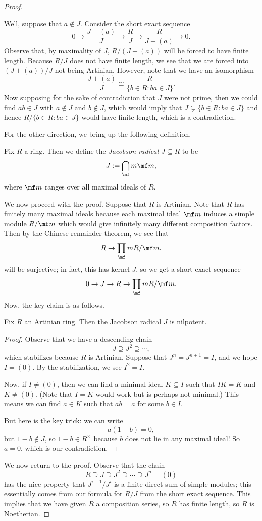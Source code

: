 \begin{proof}
\begin{itemize}
		Well, suppose that $a\notin J$. Consider the short exact sequence
		\[0\to\frac{J+(a)}J\to \frac RJ\to\frac R{J+(a)}\to0.\]
		Observe that, by maximality of $J$, $R/(J+(a))$ will be forced to have finite length. Because $R/J$ does not have finite length, we see that we are forced into $(J+(a))/J$ not being Artinian. However, note that we have an isomorphism
		\[\frac{J+(a)}J\cong\frac R{\{b\in R:ba\in J\}}.\]
		Now supposing for the sake of contradiction that $J$ were not prime, then we could find $ab\in J$ with $a\notin J$ and $b\notin J$, which would imply that $J\subsetneq\{b\in R:ba\in J\}$ and hence $R/\{b\in R:ba\in J\}$ would have finite length, which is a contradiction.
	\end{itemize}
	For the other direction, we bring up the following definition.
	\begin{definition}
		Fix $R$ a ring. Then we define the \textit{Jacobson radical} $J\subseteq R$ to be
		\[J:=\bigcap_\mf m\mf m,\]
		where $\mf m$ ranges over all maximal ideals of $R$.
	\end{definition}
	We now proceed with the proof. Suppose that $R$ is Artinian. Note that $R$ has finitely many maximal ideals because each maximal ideal $\mf m$ induces a simple module $R/\mf m$ which would give infinitely many different composition factors. %
	Then by the Chinese remainder theorem, we see that
	\[R\to\prod_\mf mR/\mf m.\]
	will be surjective; in fact, this has kernel $J$, so we get a short exact sequence
	\[0\to J\to R\to\prod_\mf mR/\mf m.\]
	Now, the key claim is as follows.
	\begin{lemma}
		Fix $R$ an Artinian ring. Then the Jacobson radical $J$ is nilpotent.
	\end{lemma}
	\begin{proof}
		Observe that we have a descending chain
		\[J\supseteq J^2\supseteq\cdots,\]
		which stabilizes because $R$ is Artinian. Suppose that $J^n=J^{n+1}=I$, and we hope $I=(0)$. By the stabilization, we see $I^2=I$.

		Now, if $I\ne(0)$, then we can find a minimal ideal $K\subseteq I$ such that $IK=K$ and $K\ne(0)$. (Note that $I=K$ would work but is perhaps not minimal.) This means we can find $a\in K$ such that $ab=a$ for some $b\in I$.

		But here is the key trick: we can write
		\[a(1-b)=0,\]
		but $1-b\notin J$, so $1-b\in R^\times$ because $b$ does not lie in any maximal ideal! So $a=0$, which is our contradiction.
	\end{proof}
	We now return to the proof. Observe that the chain
	\[R\supseteq J\supseteq J^2\supseteq\cdots\supseteq J^n=(0)\]
	has the nice property that $J^{i+1}/J^i$ is a finite direct sum of simple modules; this essentially comes from our formula for $R/J$ from the short exact sequence. %
	This implies that we have given $R$ a composition series, so $R$ has finite length, so $R$ is Noetherian.


\end{proof}
